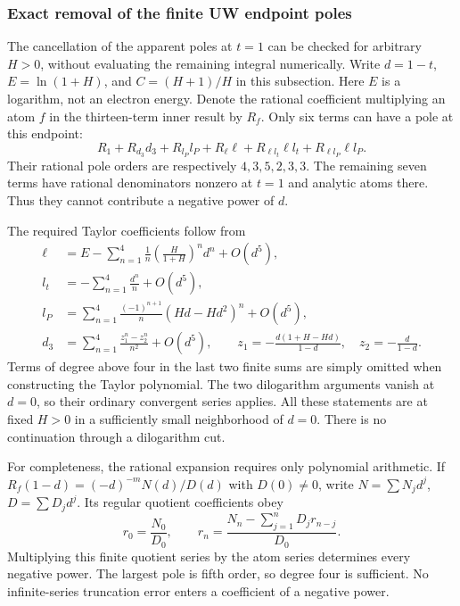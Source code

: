 \subsubsection{Exact removal of the finite UW endpoint poles}
\label{sec:comp-UW-upper-certificate}
The cancellation of the apparent poles at $t=1$ can be checked for
arbitrary $H>0$, without evaluating the remaining integral numerically.
Write $d=1-t$, $E=\ln(1+H)$, and $C=(H+1)/H$ in this subsection.
Here $E$ is a logarithm, not an electron energy.
Denote the rational coefficient multiplying an atom $f$ in the
thirteen-term inner result by $R_f$.  Only six terms can have a pole
at this endpoint:
\begin{equation}
 R_1+R_{d_3}d_3+R_{l_P}l_P
       +R_\ell\ell+R_{\ell l_t}\ell l_t+R_{\ell l_P}\ell l_P.
\end{equation}
Their rational pole orders are respectively $4,3,5,2,3,3$.
The remaining seven terms have rational denominators nonzero at $t=1$
and analytic atoms there.  Thus they cannot contribute a negative power
of $d$.

The required Taylor coefficients follow from
\begin{align}
 \ell&=E-\sum_{n=1}^4\frac1n
                   \left(\frac{H}{1+H}\right)^n d^n+O(d^5),\\
 l_t&=-\sum_{n=1}^4\frac{d^n}{n}+O(d^5),\\
 l_P&=\sum_{n=1}^4\frac{(-1)^{n+1}}n
                         (Hd-Hd^2)^n+O(d^5),\\
 d_3&=\sum_{n=1}^4\frac{z_1^n-z_2^n}{n^2}+O(d^5),
 \qquad z_1=-\frac{d(1+H-Hd)}{1-d},\quad z_2=-\frac d{1-d}.
\end{align}
Terms of degree above four in the last two finite sums are simply omitted
when constructing the Taylor polynomial.  The two dilogarithm arguments
vanish at $d=0$, so their ordinary convergent series applies.  All these
statements are at fixed $H>0$ in a sufficiently small neighborhood of
$d=0$.  There is no continuation through a dilogarithm cut.

For completeness, the rational expansion requires only polynomial
arithmetic.  If $R_f(1-d)=(-d)^{-m}N(d)/D(d)$ with $D(0)\ne0$, write
$N=\sum N_jd^j$, $D=\sum D_jd^j$.  Its regular quotient coefficients obey
\begin{equation}
 r_0=\frac{N_0}{D_0},\qquad
 r_n=\frac{N_n-\sum_{j=1}^nD_jr_{n-j}}{D_0}.
\end{equation}
Multiplying this finite quotient series by the atom series determines
every negative power.  The largest pole is fifth order, so degree four
is sufficient.  No infinite-series truncation error enters a coefficient
of a negative power.

